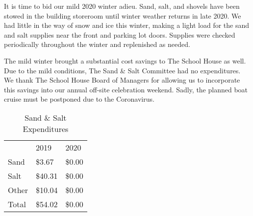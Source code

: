 \documentclass[letterpaper,12pt]{texMemo}
\begin{document}
\maketitle

It is time to bid our mild 2020 winter adieu. Sand, salt, and shovels
have been stowed in the building storeroom until winter weather
returns in late 2020.  We had little in the way of snow and ice this
winter, making a light load for the sand and salt supplies near the
front and parking lot doors. Supplies were checked periodically
throughout the winter and replenished as needed.

The mild winter brought a substantial cost savings to The School House
as well. Due to the mild conditions, The Sand \& Salt Committee had no
expenditures. We thank The School House Board of Managers for allowing
us to incorporate this savings into our annual off-site celebration
weekend. Sadly, the planned boat cruise must be postponed due to the
Coronavirus.

\begin{table}[h]
\centering
\begin{tabular}{lll}
      & 2019    & 2020   \\
Sand  & \$3.67  & \$0.00 \\
Salt  & \$40.31 & \$0.00 \\
Other & \$10.04 & \$0.00 \\ \cline{2-3} 
Total & \$54.02 & \$0.00
\end{tabular}
\caption{Sand \& Salt Expenditures}
\label{tab:my-table}
\end{table}
\end{document}
